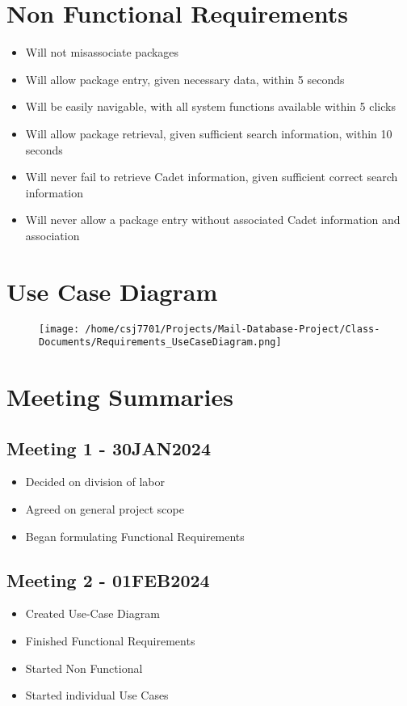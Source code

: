 \documentclass[11pt]{article}
\begin{document}
\section*{Non Functional Requirements}
\label{sec:orgfabef02}
\begin{itemize}
\item Will not misassociate packages
\item Will allow package entry, given necessary data, within 5 seconds
\item Will be easily navigable, with all system functions available within 5 clicks
\item Will allow package retrieval, given sufficient search information, within 10 seconds
\item Will never fail to retrieve Cadet information, given sufficient correct search information
\item Will never allow a package entry without associated Cadet information and association
\end{itemize}
\section*{Use Case Diagram}
\label{sec:org29848ab}

\begin{figure}[htbp]
\centering
\texttt{[image: /home/csj7701/Projects/Mail-Database-Project/Class-Documents/Requirements\_UseCaseDiagram.png]}
\end{figure}
\newpage
\section*{Meeting Summaries}
\label{sec:org9639d6a}
\subsection*{Meeting 1 - 30JAN2024}
\label{sec:org8b4dc90}
\begin{itemize}
\item Decided on division of labor
\item Agreed on general project scope
\item Began formulating Functional Requirements
\end{itemize}
\subsection*{Meeting 2 - 01FEB2024}
\label{sec:org1b1fbf1}
\begin{itemize}
\item Created Use-Case Diagram
\item Finished Functional Requirements
\item Started Non Functional
\item Started individual Use Cases
\end{itemize}
\end{document}

